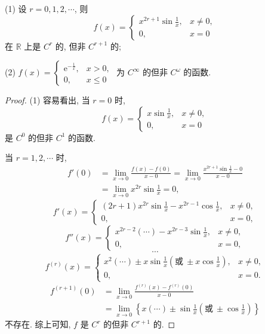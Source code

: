 \begin{example}\label{ex:3.2.7}
(1) 设 $r = 0, 1, 2, \cdots$, 则
\[
f(x) = \begin{cases}x^{2r+1}\sin\frac{1}{x}, & x \neq 0,\\ 0, & x = 0\end{cases}
\]
在 $\mathbb{R}$ 上是 $C^{r}$ 的, 但非 $C^{r+1}$ 的;

(2) $f(x) = \begin{cases}\mathrm{e}^{-\frac{1}{x}}, & x > 0,\\ 0, & x \leqslant 0\end{cases}$ 为 $C^{\infty}$ 的但非 $C^{\omega}$ 的函数.
\end{example}

\begin{proof}
(1) 容易看出, 当 $r = 0$ 时,
\[
f(x) = \begin{cases}x\sin\frac{1}{x}, & x \neq 0,\\ 0, & x = 0\end{cases}
\]
是 $C^{0}$ 的但非 $C^{1}$ 的函数.

当 $r = 1, 2, \cdots$ 时,
\[
\begin{aligned}
f'(0) &= \lim_{x\to0}\frac{f(x) - f(0)}{x - 0} = \lim_{x\to0}\frac{x^{2r+1}\sin\frac{1}{x} - 0}{x - 0}\\
&= \lim_{x\to0}x^{2r}\sin\frac{1}{x} = 0,
\end{aligned}
\]
\[
f'(x) = \begin{cases}(2r+1)x^{2r}\sin\frac{1}{x} - x^{2r-1}\cos\frac{1}{x}, & x \neq 0,\\ 0, & x = 0,\end{cases}
\]
\[
f''(x) = \begin{cases}x^{2r-2}(\cdots) - x^{2r-3}\sin\frac{1}{x}, & x \neq 0,\\ 0, & x = 0,\end{cases}
\]
\[
\cdots
\]
\[
f^{(r)}(x) = \begin{cases}x^{2}(\cdots) \pm x\sin\frac{1}{x}\left(\text{或}\ \pm x\cos\frac{1}{x}\right), & x \neq 0,\\ 0, & x = 0.\end{cases}
\]
\[
\begin{aligned}
f^{(r+1)}(0) &= \lim_{x\to0}\frac{f^{(r)}(x) - f^{(r)}(0)}{x - 0}\\
&= \lim_{x\to0}\left\{x(\cdots) \pm \sin\frac{1}{x}\left(\text{或}\ \pm\cos\frac{1}{x}\right)\right\}
\end{aligned}
\]
不存在. 综上可知, $f$ 是 $C^{r}$ 的但非 $C^{r+1}$ 的.


\end{proof}

